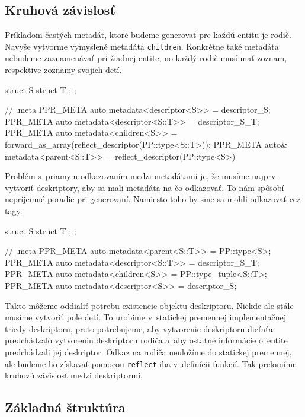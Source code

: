 \subsection*{Kruhová závislosť}

Príkladom častých metadát, ktoré budeme generovať pre každú entitu je rodič. Navyše vytvorme vymyslené metadáta \texttt{children}. Konkrétne také metadáta nebudeme zaznamenávať pri žiadnej entite, no každý rodič musí mať zoznam, respektíve zoznamy svojich detí.
\begin{code}
struct S { struct T {}; };

// .meta
PPR_META auto metadata<descriptor<S>> = descriptor_S{};
PPR_META auto metadata<descriptor<S::T>> = descriptor_S_T{};
PPR_META auto metadata<children<S>> =
    forward_as_array(reflect_descriptor(PP::type<S::T>));
PPR_META auto& metadata<parent<S::T>> = reflect_descriptor(PP::type<S>)
\end{code}
Problém s~priamym odkazovaním medzi metadátami je, že musíme najprv vytvoriť deskriptory, aby sa mali metadáta na čo odkazovať. To nám spôsobí nepríjemné poradie pri generovaní. Namiesto toho by sme sa mohli odkazovať cez tagy.
\begin{code}
struct S { struct T {}; };

// .meta
PPR_META auto metadata<parent<S::T>> = PP::type<S>;
PPR_META auto metadata<descriptor<S::T>> = descriptor_S_T{};
PPR_META auto metadata<children<S>> = PP::type_tuple<S::T>;
PPR_META auto metadata<descriptor<S>> = descriptor_S{};
\end{code}
Takto môžeme oddialiť potrebu existencie objektu deskriptoru. Niekde ale stále musíme vytvoriť pole detí. To urobíme v~statickej premennej implementačnej triedy deskriptoru, preto potrebujeme, aby vytvorenie deskriptoru dieťaťa predchádzalo vytvoreniu deskriptoru rodiča a~aby ostatné informácie o~entite predchádzali jej deskriptor. Odkaz na rodiča neuložíme do statickej premennej, ale budeme ho získavať pomocou \texttt{reflect} iba v~definícii funkcií. Tak prelomíme kruhovú závislosť medzi deskriptormi.

\subsection*{Základná štruktúra}

